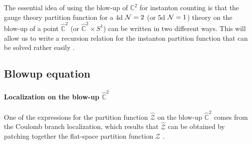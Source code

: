 \documentclass[letterpaper, 11pt]{article}
\def\IC{\mathbb{C}}
\def\CN{{\cal N}}
\begin{document}
The essential idea of using the blow-up of ${\IC}^2$ for instanton counting is that the gauge theory partition function for a 4d $\CN=2$ (or 5d $\CN=1$) theory on the blow-up of a point $\hat{\IC}^2$ (or $\hat{\IC}^2 \times S^1$) can be written in two different ways. This will allow us to write a recursion relation for the instanton partition function that can be solved rather easily \cite{Nakajima:2003pg, Nakajima:2003uh,Nakajima:2005fg, Keller:2012da}. 




\subsection{Blowup equation}

\paragraph{Localization on the blow-up $\hat{\IC}^2$}

One of the expressions for the partition function $\hat{\mathcal{Z}}$ on the blow-up $\hat{\IC}^2$ comes from the Coulomb branch localization, which results that $\hat{\mathcal{Z}}$ can be obtained by patching together the flat-space partition function $\mathcal Z$ \cite{Nekrasov:2003vi}.
\end{document}
